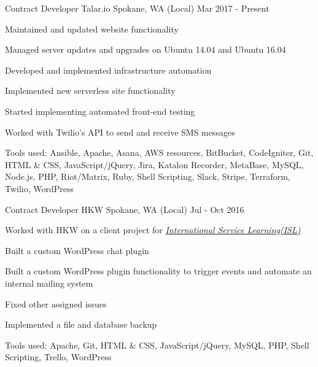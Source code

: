 \begin{cventries}
  \cventry
    {Contract Developer} %
    {Talar.io} %
    {Spokane, WA (Local)} %
    {Mar 2017 - Present} %
    {
      \begin{cvitems} %
        \item {Maintained and updated website functionality}
        \item {Managed server updates and upgrades on Ubuntu 14.04 and Ubuntu 16.04}
        \item {Developed and implemented infrastructure automation}
        \item {Implemented new serverless site functionality}
        \item {Started implementing automated front-end testing}
        \item {Worked with Twilio's API to send and receive SMS messages}
        \item {Tools used: Ansible, Apache, Asana, AWS resources, BitBucket, CodeIgniter, Git, HTML \& CSS, JavaScript/jQuery, Jira, Katalon Recorder, MetaBase, MySQL, Node.js, PHP, Riot/Matrix, Ruby, Shell Scripting, Slack, Stripe, Terraform, Twilio, WordPress}
      \end{cvitems}
    }

  \cventry
    {Contract Developer} %
    {HKW} %
    {Spokane, WA (Local)} %
    {Jul - Oct 2016} %
    {
      \begin{cvitems} %
        \item {Worked with HKW on a client project for \emph{\href{https://www.islonline.org/}{International Service Learning(ISL)}}}
        \item {Built a custom WordPress chat plugin}
        \item {Built a custom WordPress plugin functionality to trigger events and automate an internal mailing system}
        \item {Fixed other assigned issues}
        \item {Implemented a file and database backup}
        \item {Tools used: Apache, Git, HTML \& CSS, JavaScript/jQuery, MySQL, PHP, Shell Scripting, Trello, WordPress}
      \end{cvitems}
    }


\end{cventries}
